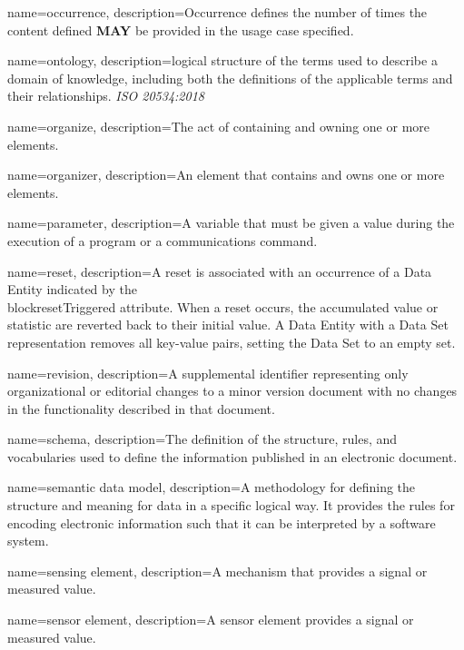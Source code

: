 {
    name={occurrence},
	description={Occurrence defines the number of times the content defined \textbf{MAY} be provided in the usage case specified.}
}

{
    name={ontology},
	description={logical structure of the terms used to describe a domain of knowledge, including both the definitions of the applicable terms and their relationships. \textit{ISO 20534:2018}}
}

{
    name={organize},
	description={The act of containing and owning one or more elements.}
}

{
    name={organizer},
	description={An element that contains and owns one or more elements.}
}

{
    name={parameter},
	description={A variable that must be given a value during the execution of a program or a communications command.}
}

{
    name={reset},
	description={A reset is associated with an occurrence of a \gls{Data Entity} indicated by the \\block{resetTriggered} attribute. When a reset occurs, the accumulated value or statistic are reverted back to their initial value. A \gls{Data Entity} with a \gls{Data Set} representation removes all \glspl{key-value pair}, setting the \gls{Data Set} to an empty set.}
}

{
    name={revision},
	description={A supplemental identifier representing only organizational or editorial changes to a \gls{minor} version document with no changes in the functionality described in that document.}
}

{
    name={schema},
	description={The definition of the structure, rules, and vocabularies used to define the information published in an electronic document.}
}

{
    name={semantic data model},
	description={A methodology for defining the structure and meaning for data in a specific logical way. It provides the rules for encoding electronic information such that it can be interpreted by a software system. }
}

{
    name={sensing element},
	description={A mechanism that provides a signal or measured value.}
}

{
    name={sensor element},
	description={A \gls{sensor element} provides a signal or measured value.}
}

